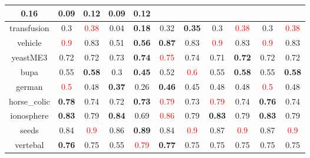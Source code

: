 \documentclass{article}%
\begin{document}
\begin{tabular}{c|cccccccccc}
{0.16
}&0.09&\textbf{0.12}&0.09&\textbf{0.12}\\%
\hline%
transfusion&0.3&\textcolor{red}{ 
0.38
}&0.04&\textbf{0.18}&0.32&\textbf{0.35}&0.3&\textcolor{red}{ 
0.38
}&0.3&\textcolor{red}{ 
0.38
}\\%
\hline%
vehicle&\textcolor{red}{ 
0.9
}&0.83&0.51&\textbf{0.56}&\textbf{0.87}&0.83&\textcolor{red}{ 
0.9
}&0.83&\textcolor{red}{ 
0.9
}&0.83\\%
\hline%
yeastME3&0.72&0.72&0.73&\textbf{0.74}&\textcolor{red}{ 
0.75
}&0.74&0.71&\textbf{0.72}&0.72&0.72\\%
\hline%
bupa&0.55&\textbf{0.58}&0.3&\textbf{0.45}&0.52&\textcolor{red}{ 
0.6
}&0.55&\textbf{0.58}&0.55&\textbf{0.58}\\%
\hline%
german&\textcolor{red}{ 
0.5
}&0.48&\textbf{0.37}&0.26&\textbf{0.46}&0.45&0.48&0.48&\textcolor{red}{ 
0.5
}&0.48\\%
\hline%
horse\_colic&\textbf{0.78}&0.74&0.72&\textbf{0.73}&\textcolor{red}{ 
0.79
}&0.73&\textcolor{red}{ 
0.79
}&0.74&\textbf{0.76}&0.74\\%
\hline%
ionosphere&\textbf{0.83}&0.79&\textbf{0.84}&0.69&\textcolor{red}{ 
0.86
}&0.79&\textbf{0.83}&0.79&\textbf{0.83}&0.79\\%
\hline%
seeds&0.84&\textcolor{red}{ 
0.9
}&0.86&\textbf{0.89}&0.84&\textcolor{red}{ 
0.9
}&0.87&\textcolor{red}{ 
0.9
}&0.87&\textcolor{red}{ 
0.9
}\\%
\hline%
vertebal&\textbf{0.76}&0.75&0.55&\textcolor{red}{ 
0.79
}&\textbf{0.77}&0.75&0.75&0.75&0.75&0.75\\%
\hline%
\end{tabular}

%
\end{document}
